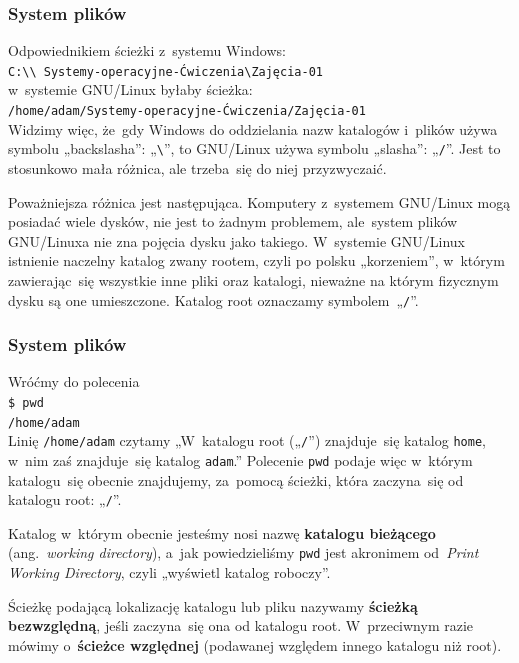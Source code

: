 \documentclass[10pt,t]{beamer}
\begin{document}
\begin{frame}
  \frametitle{System plików}


  Odpowiednikiem ścieżki z~systemu Windows: \\
  \texttt{C:\textbackslash\textbackslash
    Systemy-operacyjne-Ćwiczenia\textbackslash Zajęcia-01} \\
  w~systemie GNU/Linux byłaby ścieżka: \\
  \texttt{/home/adam/Systemy-operacyjne-Ćwiczenia/Zajęcia-01} \\
  Widzimy więc, że~gdy Windows do oddzielania nazw katalogów i~plików
  używa symbolu „backslasha”: „\texttt{\textbackslash}”, to GNU/Linux
  używa symbolu „slasha”: „\texttt{/}”. Jest to stosunkowo mała różnica,
  ale trzeba~się do niej przyzwyczaić.

  Poważniejsza różnica jest następująca. Komputery z~systemem GNU/Linux
  mogą posiadać wiele dysków, nie jest to żadnym problemem, ale~system
  plików GNU/Linuxa nie zna pojęcia dysku jako takiego. W~systemie GNU/Linux
  istnienie naczelny katalog zwany rootem, czyli po polsku „korzeniem”,
  w~którym zawierając~się wszystkie inne pliki oraz katalogi, nieważne na
  którym fizycznym dysku są one umieszczone. Katalog root oznaczamy
  symbolem~„\texttt{/}”.

\end{frame}





\begin{frame}
  \frametitle{System plików}


  Wróćmy do polecenia \\
  \texttt{\$ pwd} \\
  \texttt{/home/adam} \\
  Linię \texttt{/home/adam} czytamy „W~katalogu root („\texttt{/}”)
  znajduje~się katalog \texttt{home}, w~nim zaś znajduje~się katalog
  \texttt{adam}.” Polecenie \texttt{pwd} podaje więc w~którym katalogu~się
  obecnie znajdujemy, za~pomocą ścieżki, która zaczyna~się od katalogu root:
  „\texttt{/}”.

  Katalog w~którym obecnie jesteśmy nosi nazwę \textbf{katalogu bieżącego}
  (ang.~\textit{working directory}), a~jak powiedzieliśmy \texttt{pwd} jest
  akronimem od~\textit{Print Working Directory}, czyli „wyświetl katalog
  roboczy”.

  Ścieżkę podającą lokalizację katalogu lub pliku nazywamy
  \textbf{ścieżką bezwzględną}, jeśli zaczyna~się ona od katalogu root.
  W~przeciwnym razie mówimy o~\textbf{ścieżce względnej} (podawanej
  względem innego katalogu niż root).

\end{frame}
\end{document}
